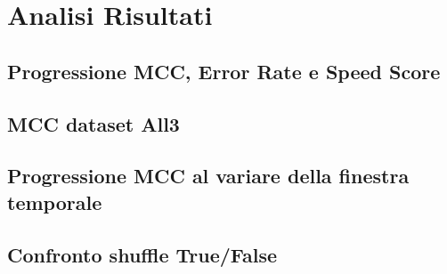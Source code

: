 \chapter{Analisi Risultati}

\medskip

\section{Progressione MCC, Error Rate e Speed Score}

\section{MCC dataset All3}

\section{Progressione MCC al variare della finestra temporale}

\section{Confronto shuffle True/False}

 \vspace{-0.5cm}
 \vspace{-0.3cm}
